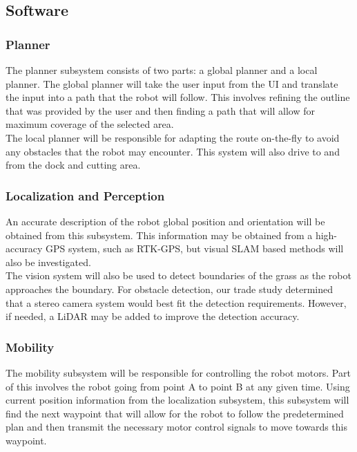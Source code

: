 \documentclass[12pt]{extarticle}
\begin{document}
  \subsection{Software}
    \subsubsection{Planner}
      The planner subsystem consists of two parts: a global planner and a local planner. The global planner will take the user input from the UI and translate the input into a path that the robot will follow. This involves refining the outline that was provided by the user and then finding a path that will allow for maximum coverage of the selected area. \\ 
      
      The local planner will be responsible for adapting the route on-the-fly to avoid any obstacles that the robot may encounter. This system will also drive to and from the dock and cutting area. 
      
    \subsubsection{Localization and Perception}
      An accurate description of the robot global position and orientation will be obtained from this subsystem. This information may be obtained from a high-accuracy GPS system, such as RTK-GPS, but visual SLAM based methods will also be investigated. \\
      
      The vision system will also be used to detect boundaries of the grass as the robot approaches the boundary. For obstacle detection, our trade study determined that a stereo camera system would best fit the detection requirements. However, if needed, a LiDAR may be added to improve the detection accuracy. 
    
    \subsubsection{Mobility}
      The mobility subsystem will be responsible for controlling the robot motors. Part of this involves the robot going from point A to point B at any given time. Using current position information from the localization subsystem, this subsystem will find the next waypoint that will allow for the robot to follow the predetermined plan and then transmit the necessary motor control signals to move towards this waypoint. \\
      
\end{document}
